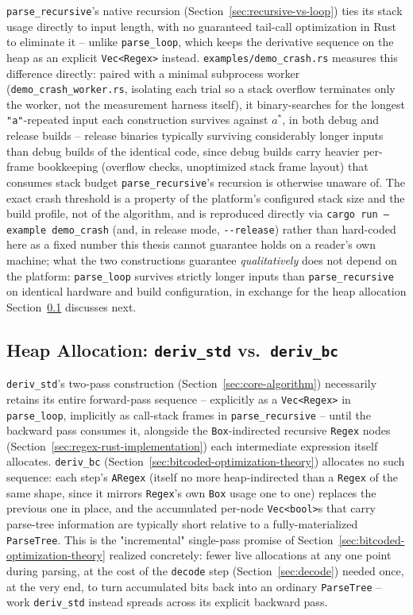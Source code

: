 \texttt{parse\_recursive}'s native recursion
(Section~\ref{sec:recursive-vs-loop}) ties its stack usage directly to
input length, with no guaranteed tail-call optimization in Rust to
eliminate it -- unlike \texttt{parse\_loop}, which keeps the derivative
sequence on the heap as an explicit \texttt{Vec<Regex>} instead.
\texttt{examples/demo\_crash.rs} measures this difference directly:
paired with a minimal subprocess worker (\texttt{demo\_crash\_worker.rs},
isolating each trial so a stack overflow terminates only the worker, not
the measurement harness itself), it binary-searches for the longest
\texttt{"a"}-repeated input each construction survives against
$a^{*}$, in both debug and release builds -- release binaries typically
surviving considerably longer inputs than debug builds of the identical
code, since debug builds carry heavier per-frame bookkeeping (overflow
checks, unoptimized stack frame layout) that consumes stack budget
\texttt{parse\_recursive}'s recursion is otherwise unaware of. The exact
crash threshold is a property of the platform's configured stack size
and the build profile, not of the algorithm, and is reproduced directly
via \texttt{cargo run --example demo\_crash} (and, in release mode,
\texttt{-{}-release}) rather than hard-coded here as a fixed number this
thesis cannot guarantee holds on a reader's own machine; what the two
constructions guarantee \emph{qualitatively} does not depend on the
platform: \texttt{parse\_loop} survives strictly longer inputs than
\texttt{parse\_recursive} on identical hardware and build configuration,
in exchange for the heap allocation Section~\ref{sec:heap-allocation}
discusses next.

\subsection{Heap Allocation: \texttt{deriv\_std} vs.\ \texttt{deriv\_bc}}
\label{sec:heap-allocation}

\texttt{deriv\_std}'s two-pass construction
(Section~\ref{sec:core-algorithm}) necessarily retains its entire
forward-pass sequence -- explicitly as a \texttt{Vec<Regex>} in
\texttt{parse\_loop}, implicitly as call-stack frames in
\texttt{parse\_recursive} -- until the backward pass consumes it,
alongside the \texttt{Box}-indirected recursive \texttt{Regex} nodes
(Section~\ref{sec:regex-rust-implementation}) each intermediate
expression itself allocates. \texttt{deriv\_bc}
(Section~\ref{sec:bitcoded-optimization-theory}) allocates no such
sequence: each step's \texttt{ARegex} (itself no more heap-indirected
than a \texttt{Regex} of the same shape, since it mirrors
\texttt{Regex}'s own \texttt{Box} usage one to one) replaces the
previous one in place, and the accumulated per-node
\texttt{Vec<bool>}s that carry parse-tree information are typically
short relative to a fully-materialized \texttt{ParseTree}. This is the
"incremental" single-pass promise of
Section~\ref{sec:bitcoded-optimization-theory} realized concretely:
fewer live allocations at any one point during parsing, at the cost of
the \texttt{decode} step (Section~\ref{sec:decode}) needed once, at the
very end, to turn accumulated bits back into an ordinary
\texttt{ParseTree} -- work \texttt{deriv\_std} instead spreads across its
explicit backward pass.

